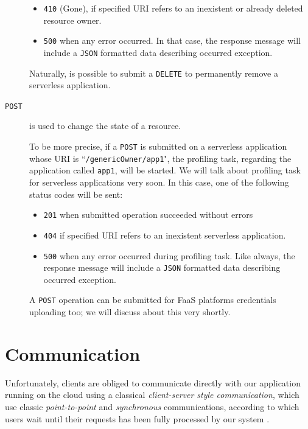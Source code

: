 \documentclass[12pt,a4paper]{report}
\newcommand{\QuoteIntro}{``}
\begin{document}
\begin{description}
\begin{itemize}
		\item \texttt{410} (Gone), if specified URI refers to an inexistent or already deleted resource owner.
		
		\item \texttt{500} when any error occurred. In that case, the response message will include a \texttt{JSON} formatted data describing occurred exception.
	\end{itemize}

	Naturally, is possible to submit a \texttt{DELETE} to permanently remove a serverless application. 
	
	\item[\texttt{POST}] is used to change the state of a resource.
	
	To be more precise, if a \texttt{POST} is submitted on a serverless application whose URI is \QuoteIntro\texttt{/genericOwner/app1}", the profiling task, regarding the application called \texttt{app1}, will be started. We will talk about profiling task for serverless applications very soon. In this case, one of the following status codes will be sent:
	
	\begin{itemize}
		\item \texttt{201} when submitted operation succeeded without errors
		
		\item \texttt{404} if specified URI refers to an inexistent serverless application.
		
		\item \texttt{500} when any error occurred during profiling task. Like always, the response message will include a \texttt{JSON} formatted data describing occurred exception.
	\end{itemize}
	
	A \texttt{POST} operation can be submitted for FaaS platforms credentials uploading too; we will discuss about this very shortly. 
	
\end{description}	

\section{Communication}

Unfortunately, clients are obliged to communicate directly with our application running on the cloud using a classical \textit{client-server style communication}, which use classic \textit{point-to-point} and \textit{synchronous} communications, according to which users wait until their requests has been fully processed by our system \cite{SDCC}. 
\end{document}
